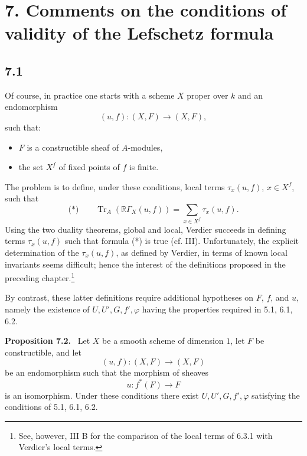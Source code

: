 \documentclass[11pt]{article}
\newenvironment{statement}[1]{\par\medskip\noindent\textbf{#1.}\ }{\par\medskip}
\providecommand{\Tr}{\operatorname{Tr}}
\providecommand{\Tr}{\operatorname{Tr}}
\providecommand{\Tr}{\operatorname{Tr}}
\providecommand{\Tr}{\operatorname{Tr}}
\providecommand{\Tr}{\operatorname{Tr}}
\begin{document}
\section*{7. Comments on the conditions of validity of the Lefschetz formula}

\subsection*{7.1}
Of course, in practice one starts with a scheme $X$ proper over $k$ and an endomorphism
\[
(u,f):(X,F)\longrightarrow (X,F),
\]
such that:
\begin{itemize}
\item $F$ is a constructible sheaf of $A$-modules,
\item the set $X^f$ of fixed points of $f$ is finite.
\end{itemize}
The problem is to define, under these conditions, local terms $\tau_x(u,f)$, $x\in X^f$, such that
\[
\text{(*)}\qquad \Tr_A(\mathbb{R}\Gamma_X(u,f))=\sum_{x\in X^f}\tau_x(u,f).
\]
Using the two duality theorems, global and local, Verdier succeeds in defining terms $\tau_x(u,f)$ such that formula (*) is true (cf. III). Unfortunately, the explicit determination of the $\tau_x(u,f)$, as defined by Verdier, in terms of known local invariants seems difficult; hence the interest of the definitions proposed in the preceding chapter.\footnote{See, however, III B for the comparison of the local terms of 6.3.1 with Verdier's local terms.}

By contrast, these latter definitions require additional hypotheses on $F$, $f$, and $u$, namely the existence of $U,U',G,f',\varphi$ having the properties required in 5.1, 6.1, 6.2.

\begin{statement}{Proposition 7.2}
Let $X$ be a smooth scheme of dimension $1$, let $F$ be constructible, and let
\[
(u,f):(X,F)\longrightarrow (X,F)
\]
be an endomorphism such that the morphism of sheaves
\[
u:f^*(F)\longrightarrow F
\]
is an isomorphism. Under these conditions there exist $U,U',G,f',\varphi$ satisfying the conditions of 5.1, 6.1, 6.2.
\end{statement}
\end{document}
